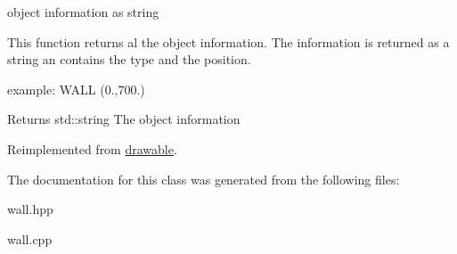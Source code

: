 object information as string 

This function returns al the object information. The information is returned as a string an contains the type and the position.

example\+: W\+A\+LL (0.,700.) \begin{DoxyReturn}{Returns}
std\+::string The object information 
\end{DoxyReturn}


Reimplemented from \hyperlink{classdrawable_a2ed0f8bb53f33477f7722efa7bb24583}{drawable}.



The documentation for this class was generated from the following files\+:\begin{DoxyCompactItemize}
\item 
wall.\+hpp\item 
wall.\+cpp\end{DoxyCompactItemize}
